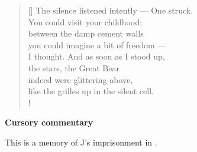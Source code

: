 \documentclass[a4paper,12pt,twoside,final]{book}
\begin{document}
\newpage


\settowidth{\versewidth}{The silence listened intently --- One struck.}

\begin{verse}[\versewidth]
  The silence listened intently --- One struck. \\
  You could visit your childhood; \\
  between the damp cement walls \\
  you could imagine a bit of freedom --- \\
  I thought. And as soon as I stood up, \\
  the stars, the Great Bear \\
  indeed were glittering above, \\
  like the grilles up in the silent cell. \\!
\end{verse}


\bigskip

\noindent \textbf{Cursory commentary}

\medskip

This is a memory of J's imprisonment in .

\newpage

\settowidth{\versewidth}{gondoltam. S hát hát amint fölállok}
\end{document}
